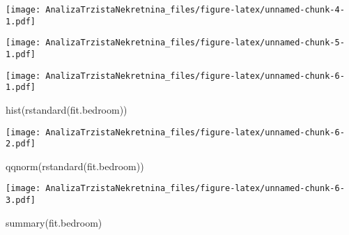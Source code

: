 \documentclass[
]{article}
\newenvironment{Shaded}{\begin{snugshade}}{\end{snugshade}}
\newcommand{\AttributeTok}[1]{\textcolor[rgb]{0.77,0.63,0.00}{#1}}
\newcommand{\FunctionTok}[1]{\textcolor[rgb]{0.00,0.00,0.00}{#1}}
\newcommand{\NormalTok}[1]{#1}
\newcommand{\OtherTok}[1]{\textcolor[rgb]{0.56,0.35,0.01}{#1}}
\newcommand{\SpecialCharTok}[1]{\textcolor[rgb]{0.00,0.00,0.00}{#1}}
\newcommand{\StringTok}[1]{\textcolor[rgb]{0.31,0.60,0.02}{#1}}
\begin{document}
\texttt{[image: AnalizaTrzistaNekretnina\_files/figure-latex/unnamed-chunk-4-1.pdf]}

\begin{Shaded}
\end{Shaded}

\texttt{[image: AnalizaTrzistaNekretnina\_files/figure-latex/unnamed-chunk-5-1.pdf]}

\begin{Shaded}
\end{Shaded}

\texttt{[image: AnalizaTrzistaNekretnina\_files/figure-latex/unnamed-chunk-6-1.pdf]}

\begin{Shaded}
\begin{Highlighting}[]
\FunctionTok{hist}\NormalTok{(}\FunctionTok{rstandard}\NormalTok{(fit.bedroom))}
\end{Highlighting}
\end{Shaded}

\texttt{[image: AnalizaTrzistaNekretnina\_files/figure-latex/unnamed-chunk-6-2.pdf]}

\begin{Shaded}
\begin{Highlighting}[]
\FunctionTok{qqnorm}\NormalTok{(}\FunctionTok{rstandard}\NormalTok{(fit.bedroom))}
\end{Highlighting}
\end{Shaded}

\texttt{[image: AnalizaTrzistaNekretnina\_files/figure-latex/unnamed-chunk-6-3.pdf]}

\begin{Shaded}
\begin{Highlighting}[]
\FunctionTok{summary}\NormalTok{(fit.bedroom)}
\end{Highlighting}
\end{Shaded}
\end{document}
